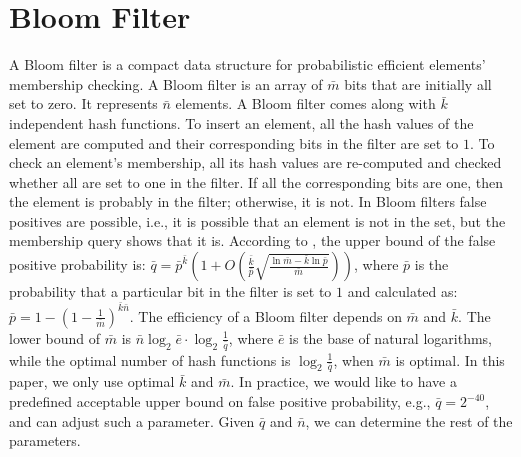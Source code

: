 


\section{Bloom Filter}\label{sec::bloom-filter-}

A Bloom filter \cite{DBLP:journals/cacm/Bloom70} is a compact data structure for probabilistic efficient  elements'  membership checking. A Bloom filter is an array of $\bar  m$ bits that are initially all set to zero. It  represents $\bar n$  elements.  A Bloom filter comes along with  $\bar k$ independent hash functions. To insert an element, all the hash values of the element are computed and their corresponding bits in the filter are set to $1$. To check an element's membership, all its hash values are re-computed and checked whether all are set to one in the filter. If all the corresponding bits are one, then the element is probably in the filter; otherwise, it is not. In Bloom filters false positives are possible, i.e., it is possible that an element is not in the set, but the membership query shows that it is. According to \cite{BoseGKMMMST08}, the upper bound of the false positive probability is: $\bar q=\bar p^{\scriptscriptstyle \bar  k}(1+O(\frac{\bar k}{\bar p}\sqrt{\frac{\ln \bar m - \bar k \ln \bar  p}{\bar m}}))$,  where $\bar p$ is the probability that a particular bit in the filter is set to $1$ and calculated as: $\bar p=1-(1-\frac{1}{\bar m})^{\scriptscriptstyle \bar k\bar n}$. The efficiency of a Bloom filter depends
on  $\bar m$ and $\bar k$. The lower bound of $\bar m$  is $\bar  n \log_{\scriptscriptstyle 2}
\bar e \cdot\log_{\scriptscriptstyle 2} \frac{1}{\bar q}$, where $\bar e$ is the base of natural logarithms,  while the optimal number of hash functions is    $\log_{\scriptscriptstyle 2} \frac{1}{\bar q}$, when $\bar m$ is optimal. In this paper, we only use optimal $\bar k$ and $\bar m$. In practice, we would like to have a predefined acceptable upper bound on false positive probability, e.g., $\bar q=2^{\scriptscriptstyle - 40}$, and can adjust such a parameter. Given $\bar q$ and $\bar n$, we can determine the rest of the parameters. 

